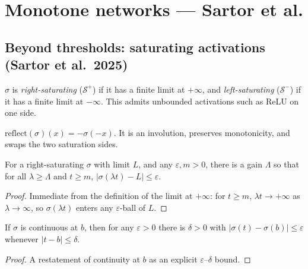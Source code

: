 \chapter{Monotone networks --- Sartor et al.}

\section{Beyond thresholds: saturating activations (Sartor et al.\ 2025)}

\begin{definition}\label{def:saturating}
  \leanok
  $\sigma$ is \emph{right-saturating} ($\mathcal{S}^+$) if it has a finite limit at $+\infty$, and
  \emph{left-saturating} ($\mathcal{S}^-$) if it has a finite limit at $-\infty$. This admits
  unbounded activations such as ReLU on one side.
\end{definition}

\begin{definition}\label{def:reflect}
  \leanok
  $\mathrm{reflect}(\sigma)(x) = -\sigma(-x)$. It is an involution, preserves monotonicity, and
  swaps the two saturation sides.
\end{definition}

\begin{lemma}\label{lem:sat-scaled}
  \leanok
  For a right-saturating $\sigma$ with limit $L$, and any $\varepsilon,m>0$, there is a gain
  $\Lambda$ so that for all $\lambda\ge\Lambda$ and $t\ge m$, $|\sigma(\lambda t)-L|\le\varepsilon$.
\end{lemma}
\begin{proof}\leanok
  Immediate from the definition of the limit at $+\infty$: for $t\ge m$, $\lambda t\to+\infty$ as
  $\lambda\to\infty$, so $\sigma(\lambda t)$ enters any $\varepsilon$-ball of $L$.
\end{proof}

\begin{lemma}\label{lem:approx-interior}
  \leanok
  If $\sigma$ is continuous at $b$, then for any $\varepsilon>0$ there is $\delta>0$ with
  $|\sigma(t)-\sigma(b)|\le\varepsilon$ whenever $|t-b|\le\delta$.
\end{lemma}
\begin{proof}\leanok
  A restatement of continuity at $b$ as an explicit $\varepsilon$--$\delta$ bound.
\end{proof}

